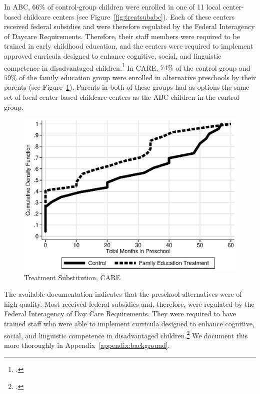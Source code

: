 \noindent In ABC, $66\%$ of control-group children were enrolled in one of 11 local center-based childcare centers (see Figure~\ref{fig:treatsubabc}). Each of these centers received federal subsidies and were therefore regulated by the Federal Interagency of Daycare Requirements. Therefore, their staff members were required to be trained in early childhood education, and the centers were required to implement approved curricula designed to enhance cognitive, social, and linguistic competence in disadvantaged children.\footnote{\citet{Burchinal_etal_1989_CD_Daycare-Pre-K-Dev}.} In CARE, $74\%$ of the control group and $59\%$ of the family education group were enrolled in alternative preschools by their parents (see Figure~\ref{fig:treatsubcare}). Parents in both of these groups had as options the same set of local center-based childcare centers as the ABC children in the control group.

\begin{figure}[H]
		\caption{Treatment Substitution, CARE} \label{fig:treatsubcare}
		\includegraphics[width=.9\columnwidth]{output/care_controlcontamination_months.eps}
\end{figure}

\noindent The available documentation indicates that the preschool alternatives were of high-quality. Most received federal subsidies and, therefore, were regulated by the Federal Interagency of Day Care Requirements. They were required to have trained staff who were able to implement curricula designed to enhance cognitive, social, and linguistic competence in disadvantaged children.\footnote{\citet{Burchinal_etal_1989_CD_Daycare-Pre-K-Dev}.} We document this more thoroughly in Appendix~\ref{appendix:background}.

